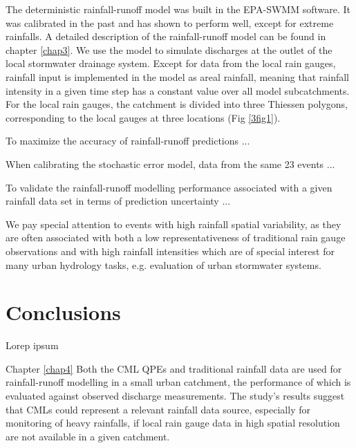 \documentclass{ctuthesis}\usepackage[]{graphicx}\usepackage[]{color}
\begin{document}
The deterministic rainfall-runoff model was built in the EPA-SWMM software. It was calibrated in the past and has shown to perform well, except for extreme rainfalls. A detailed description of the rainfall-runoff model can be found in chapter \ref{chap3}. We use the model to simulate discharges at the outlet of the local stormwater drainage system. Except for data from the local rain gauges, rainfall input is implemented in the model as areal rainfall, meaning that rainfall intensity in a given time step has a constant value over all model subcatchments. For the local rain gauges, the catchment is divided into three Thiessen polygons, corresponding to the local gauges at three locations (Fig \ref{3fig1}).

To maximize the accuracy of rainfall-runoff predictions ... 

When calibrating the stochastic error model, data from the same 23 events ...

To validate the rainfall-runoff modelling performance associated with a given rainfall data set in terms of prediction uncertainty ...


We pay special attention to events with high  rainfall spatial variability, as they are often associated with both a low representativeness of traditional rain gauge observations and with high rainfall intensities which are of special interest for many urban hydrology tasks, e.g. evaluation of urban stormwater systems.









        


\chapter{Conclusions}    \label{chap_concl}

Lorep ipsum \cite{doe}


Chapter \ref{chap4}
Both the CML QPEs and traditional rainfall data are used for rainfall-runoff modelling in a small urban catchment, the performance of which is evaluated against observed discharge measurements. The study's results suggest that CMLs could represent a relevant rainfall data source, especially for monitoring of heavy rainfalls, if local rain gauge data in high spatial resolution are not available in a given catchment.
\end{document}
